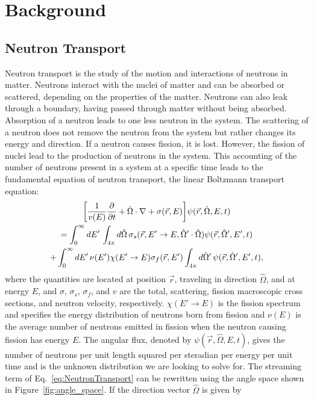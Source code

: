 \chapter{Background}

\section{Neutron Transport}

Neutron transport is the study of the motion and interactions of neutrons in matter. Neutrons interact with the nuclei of matter and can be absorbed or scattered, depending on the properties of the matter. Neutrons can also leak through a boundary, having passed through matter without being absorbed. Absorption of a neutron leads to one less neutron in the system. The scattering of a neutron does not remove the neutron from the system but rather changes its energy and direction. If a neutron causes fission, it is lost. However, the fission of nuclei lead to the production of neutrons in the system. This accounting of the number of neutrons present in a system at a specific time leads to the fundamental equation of neutron transport, the linear Boltzmann transport equation:
\begin{multline}
	\bigg [ \frac{1}{v(E)} \frac{\partial}{\partial t} + \hat{\Omega} \cdot \nabla + \sigma(\vec{r},E) \bigg ] \psi(\vec{r},\hat{\Omega},E,t) \\ = \int_{0}^{\infty} \mathop{}\!d E' \, \int_{4\pi} \mathop{}\!d \hat{\Omega} \, \sigma_{s}(\vec{r},E'\rightarrow E,\hat{\Omega}' \cdot \hat{\Omega}) \psi(\vec{r},\hat{\Omega}',E',t) \\ + \int_{0}^{\infty} \mathop{}\!d E' \, \nu(E') \chi(E'\rightarrow E) \sigma_{f}(\vec{r},E') \int_{4\pi} \mathop{}\!d \hat{\Omega}' \, \psi(\vec{r},\hat{\Omega}',E',t), 
	\label{eq:NeutronTransport}
\end{multline}
where the quantities are located at position $\vec{r}$, traveling in direction $\hat{\Omega}$, and at energy $E$, and $\sigma$, $\sigma_{s}$, $\sigma_{f}$, and $v$ are the total, scattering, fission macroscopic cross sections, and neutron velocity, respectively. $\chi(E'\rightarrow E)$ is the fission spectrum and specifies the energy distribution of neutrons born from fission and $\nu(E)$ is the average number of neutrons emitted in fission when the neutron causing fission has energy $E$. The angular flux, denoted by $\psi(\vec{r},\hat{\Omega},E,t)$, gives the number of neutrons per unit length squared per steradian per energy per unit time and is the unknown distribution we are looking to solve for. The streaming term of Eq.~\ref{eq:NeutronTransport} can be rewritten using the angle space shown in Figure~\ref{fig:angle_space}. If the direction vector $\hat{\Omega}$ is given by
